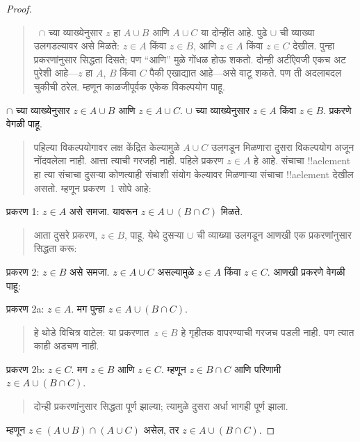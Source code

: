 \documentclass[../../../include/open-logic-section]{subfiles}
\begin{document}
\begin{proof}
\begin{quote}
~$\cap$ च्या व्याख्येनुसार $z$ हा $A \cup B$ आणि $A \cup C$ या दोन्हींत आहे. पुढे $\cup$ ची व्याख्या उलगडल्यावर असे मिळते: $z \in A$ किंवा $z \in B$, आणि $z \in A$ किंवा $z \in C$ देखील. पुन्हा प्रकरणांनुसार सिद्धता दिसते; पण “आणि” मुळे गोंधळ होऊ शकतो. दोन्ही अटींऐवजी एकच अट पुरेशी आहे---$z$ हा $A$, $B$ किंवा $C$ पैकी एखाद्यात आहे---असे वाटू शकते. पण ती अदलाबदल चुकीची ठरेल. म्हणून काळजीपूर्वक एकेक विकल्पयोग पाहू.
\end{quote}
$\cap$ च्या व्याख्येनुसार $z \in A \cup B$ आणि $z \in A \cup C$. $\cup$ च्या व्याख्येनुसार $z \in A$ किंवा $z \in B$. प्रकरणे वेगळी पाहू.
\begin{quote}
पहिल्या विकल्पयोगावर लक्ष केंद्रित केल्यामुळे $A \cup C$ उलगडून मिळणारा दुसरा विकल्पयोग अजून नोंदवलेला नाही. आत्ता त्याची गरजही नाही. पहिले प्रकरण $z \in A$ हे आहे. संचाचा !!a{element} हा त्या संचाचा दुसऱ्या कोणत्याही संचाशी संयोग केल्यावर मिळणाऱ्या संचाचा !!a{element} देखील असतो. म्हणून प्रकरण~1 सोपे आहे:
\end{quote}
प्रकरण 1: $z \in A$ असे समजा. यावरून $z \in A \cup (B \cap C)$ मिळते.
\begin{quote}
आता दुसरे प्रकरण, $z \in B$, पाहू. येथे दुसऱ्या $\cup$ ची व्याख्या उलगडून आणखी एक प्रकरणांनुसार सिद्धता करू:
\end{quote}
प्रकरण 2: $z \in B$ असे समजा. $z \in A \cup C$ असल्यामुळे $z \in A$ किंवा $z \in C$. आणखी प्रकरणे वेगळी पाहू:

प्रकरण 2a: $z \in A$. मग पुन्हा $z \in A \cup (B \cap C)$.
\begin{quote}
हे थोडे विचित्र वाटेल: या प्रकरणात~$z \in B$ हे गृहीतक वापरण्याची गरजच पडली नाही. पण त्यात काही अडचण नाही.
\end{quote}
प्रकरण 2b: $z \in C$. मग $z \in B$ आणि $z \in C$. म्हणून $z \in B \cap C$ आणि परिणामी $z \in A \cup (B \cap C)$.
\begin{quote}
दोन्ही प्रकरणांनुसार सिद्धता पूर्ण झाल्या; त्यामुळे दुसरा अर्धा भागही पूर्ण झाला.
\end{quote}
म्हणून $z \in (A \cup B) \cap (A \cup C)$ असेल, तर $z \in A \cup (B \cap C)$.
\end{proof}
\end{document}
